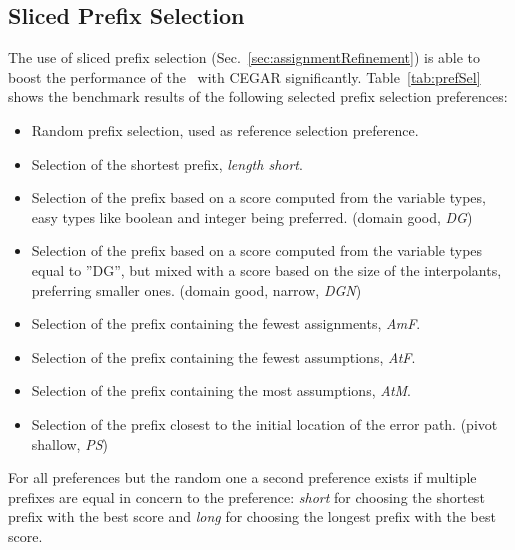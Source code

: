 \subsection{Sliced Prefix Selection}
The use of sliced prefix selection \cite{Beyer2015} (Sec.~\ref{sec:assignmentRefinement}) is able to boost the performance of the \symbolicExecutionCPA\ with CEGAR significantly.
Table~\ref{tab:prefSel} shows the benchmark results of the following selected prefix selection preferences:
\begin{itemize}
\item Random prefix selection, used as reference selection preference.
\item Selection of the shortest prefix, \emph{length short}.
\item Selection of the prefix based on a score computed from the variable types, easy types like boolean and integer being preferred. (domain good, \emph{DG})
\item Selection of the prefix based on a score computed from the variable types equal to ''DG'', but mixed with a score based on the size of the interpolants, preferring smaller ones. (domain good, narrow, \emph{DGN})
\item Selection of the prefix containing the fewest assignments, \emph{AmF}.
\item Selection of the prefix containing the fewest assumptions, \emph{AtF}.
\item Selection of the prefix containing the most assumptions, \emph{AtM}.
\item Selection of the prefix closest to the initial location of the error path. (pivot shallow, \emph{PS})
\end{itemize}
For all preferences but the random one a second preference exists if multiple prefixes are equal in concern to the preference:
\emph{short} for choosing the shortest prefix with the best score and \emph{long} for choosing the longest prefix with the best score.

